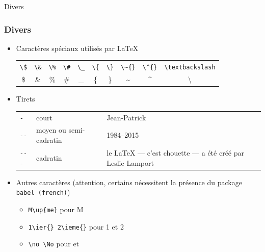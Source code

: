 \begin{frame}[fragile]{Divers}
  \frametitle{Divers}
  \begin{itemize}
  \item Caractères spéciaux utilisés par \LaTeX

  \begin{tabular}{cccccccccc}
  \lstinline|\$| & \lstinline|\&| & \lstinline|\%| & \lstinline|\#| & \lstinline|\_| & \lstinline|\{| & \lstinline|\}| & \lstinline|\~{}| & \lstinline|\^{}| & \lstinline|\textbackslash| \\
  \$ & \& & \% & \# & \_ & \{ & \} & \~{} & \^{} & \textbackslash
  \end{tabular}

  \item Tirets
   \begin{tabular}{llp{}}
     \lstinline|-| & court & Jean-Patrick\\
     \lstinline|--| & moyen ou semi-cadratin & 1984--2015\\
     \lstinline|---| & cadratin & le \LaTeX{} --- c'est chouette --- a été créé par Leslie Lamport\\
   \end{tabular}

  \item Autres caractères (attention, certains nécessitent la présence du package \texttt{babel (french)})
    \begin{itemize}
        \item \lstinline|M\up{me}| pour M
        \item \lstinline|1\ier{} 2\ieme{}| pour 1\ier{} et 2\ieme{}
        \item \lstinline|\no \No| pour \no et \No
    \end{itemize}
  \end{itemize}
\end{frame}
